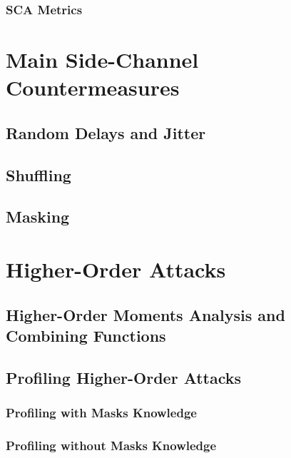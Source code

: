 \subsubsection{SCA Metrics}



\section{Main Side-Channel Countermeasures}
\subsection{Random Delays and Jitter}
\subsection{Shuffling}
\subsection{Masking}\label{sec:masking}



\section{Higher-Order Attacks}
\subsection{Higher-Order Moments Analysis and Combining Functions}
\subsection{Profiling Higher-Order Attacks}
\subsubsection{Profiling with Masks Knowledge}
\subsubsection{Profiling without Masks Knowledge}

